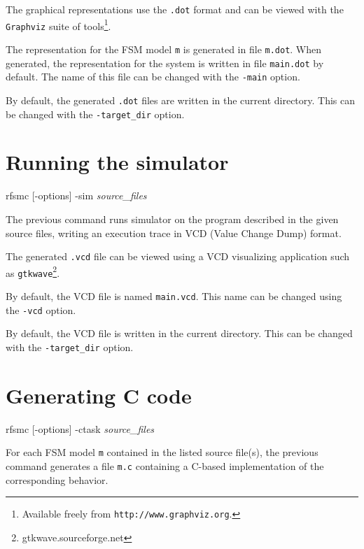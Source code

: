 The graphical representations use the \verb|.dot| format and can be viewed
with the \texttt{Graphviz} suite of tools\footnote{Available freely from
  \texttt{http://www.graphviz.org}.}.

The representation for the FSM model \verb|m| is generated in file \verb|m.dot|. When generated, the representation
for the system is written in file \verb|main.dot| by default. The name of this file can be changed
with the \verb|-main| option.

By default, the generated \verb|.dot| files are written in the current directory. This can be changed with the
\verb|-target_dir| option.

\section{Running the simulator}
\label{sec:running-simulator}

\begin{FVerbatim}[commandchars=\\\{\}]
rfsmc [-options] -sim \emph{source_files}
\end{FVerbatim}

The previous command runs simulator on the program described in the given source files, writing
an execution trace in VCD (Value Change Dump) format.

The generated \verb|.vcd| file can be viewed using a VCD visualizing application such as
\verb|gtkwave|\footnote{gtkwave.sourceforge.net}.

By default, the VCD file is named \verb|main.vcd|. This name can be changed using the \verb|-vcd| option.

By default, the VCD file is written in the current directory. This can be changed with the
\verb|-target_dir| option.

\section{Generating C code}
\label{sec:gener-c-code}

\begin{FVerbatim}[commandchars=\\\{\}]
rfsmc [-options] -ctask \emph{source_files}
\end{FVerbatim}

For each FSM model \verb|m| contained in the listed source file(s), the previous command generates a file
\verb|m.c| containing a C-based implementation of the corresponding behavior.


